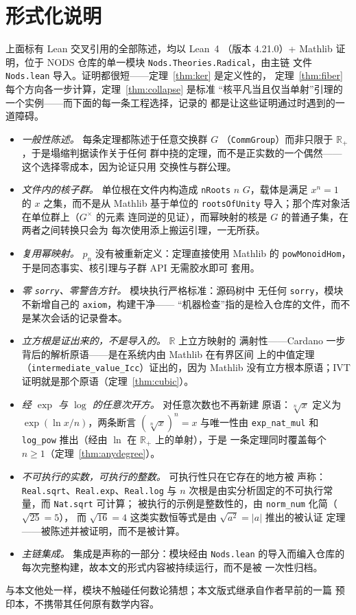 \documentclass[submission,noinfoline]{jsfds}
\newcommand{\abs}[1]{\lvert #1\rvert}
\begin{document}
\section{形式化说明}\label{sec:formal}

上面标有 Lean 交叉引用的全部陈述，均以 Lean~4 \citep{deMoura2015}
（版本 4.21.0）+ Mathlib \citep{MathlibCommunity2020} 证明，位于 NODS
仓库的单一模块 \texttt{Nods.Theories.}\allowbreak\texttt{Radical}，由主链
文件 \texttt{Nods.lean} 导入。证明都很短——定理~\ref{thm:ker} 是定义性的，
定理~\ref{thm:fiber} 每个方向各一步计算，定理~\ref{thm:collapse} 是标准
``核平凡当且仅当单射''引理的一个实例——而下面的每一条工程选择，记录的
都是让这些证明通过时遇到的一道障碍。
\begin{itemize}
\item \emph{一般性陈述。} 每条定理都陈述于任意交换群 $G$
（\texttt{CommGroup}）而非只限于 $\mathbb R_+$，于是塌缩判据读作关于任何
群中挠的定理，而不是正实数的一个偶然——这个选择零成本，因为论证只用
交换性与群公理。
\item \emph{文件内的核子群。} 单位根在文件内构造成 \texttt{nRoots}
$n$ $G$，载体是满足 $x^n=1$ 的 $x$ 之集，而不是从 Mathlib 基于单位的
\texttt{rootsOfUnity} 导入；那个库对象活在单位群上（$G^\times$ 的元素
连同逆的见证），而幂映射的核是 $G$ 的普通子集，在两者之间转换只会为
每次使用添上搬运引理，一无所获。
\item \emph{复用幂映射。} $p_n$ 没有被重新定义：定理直接使用 Mathlib 的
\texttt{powMonoidHom}，于是同态事实、核引理与子群 API 无需胶水即可
套用。
\item \emph{零 \texttt{sorry}、零警告方针。} 模块执行严格标准：源码树中
无任何 \texttt{sorry}，模块不新增自己的 \texttt{axiom}，构建干净——
``机器检查''指的是检入仓库的文件，而不是某次会话的记录誊本。
\item \emph{立方根是证出来的，不是导入的。} $\mathbb R$ 上立方映射的
满射性——Cardano 一步背后的解析原语——是在系统内由 Mathlib 在有界区间
上的中值定理（\texttt{intermediate\_value\_Icc}）证出的，因为 Mathlib
没有立方根本原语；IVT 证明就是那个原语（定理~\ref{thm:cubic}）。
\item \emph{经 $\exp$ 与 $\log$ 的任意次开方。} 对任意次数也不再新建
原语：$\sqrt[n]{x}$ 定义为 $\exp(\ln x/n)$，两条断言
$(\sqrt[n]{x})^n=x$ 与唯一性由 \texttt{exp\_nat\_mul} 和
\texttt{log\_pow} 推出（经由 $\ln$ 在 $\mathbb R_+$ 上的单射），于是
一条定理同时覆盖每个 $n\ge1$（定理~\ref{thm:anydegree}）。
\item \emph{不可执行的实数，可执行的整数。} 可执行性只在它存在的地方被
声称：\texttt{Real.sqrt}、\texttt{Real.exp}、\texttt{Real.log} 与
$n$ 次根是由实分析固定的不可执行常量，而 \texttt{Nat.sqrt} 可计算；
被执行的示例是整数性的，由 \texttt{norm\_num} 化简（$\sqrt{25}=5$），
而 $\sqrt{16}=4$ 这类实数恒等式是由 $\sqrt{a^2}=\abs a$ 推出的被认证
定理——被陈述并被证明，而不是被计算。
\item \emph{主链集成。} 集成是声称的一部分：模块经由 \texttt{Nods.lean}
的导入而编入仓库的每次完整构建，故本文的形式内容被持续运行，而不是被
一次性归档。
\end{itemize}
与本文他处一样，模块不触碰任何数论猜想；本文版式继承自作者早前的一篇
预印本，不携带其任何原有数学内容。
\end{document}
